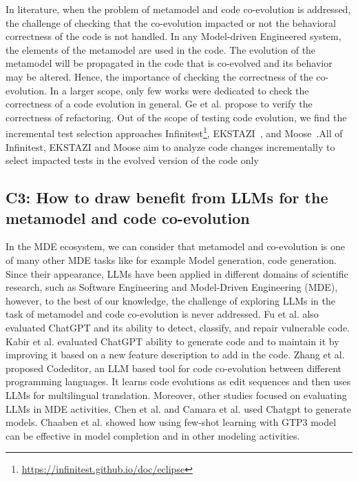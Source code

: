 In literature, when the problem of metamodel and code co-evolution is addressed, the challenge of checking that the co-evolution impacted or not the behavioral correctness of the code is not handled. In any Model-driven Engineered system, the elements of the metamodel are used in the code. The evolution of the metamodel will be propagated in the code that is co-evolved and its behavior may be altered. Hence, the importance of checking the correctness of the co-evolution. In a larger scope, only few works were dedicated to check the correctness of a code evolution in general. %
 Ge et al. \cite{ge2014Manual} propose to verify the correctness of refactoring.
Out of the scope of testing code evolution, we find the incremental test selection approaches Infinitest\footnote{\url{https://infinitest.github.io/doc/eclipse}}, EKSTAZI~\cite{7203050}, and Moose~\cite{ducasse2000moose}.All of Infinitest, EKSTAZI and Moose aim to analyze code changes incrementally to select impacted tests in the evolved version of the code only

\subsection*{C3: How to draw benefit from LLMs for the metamodel and code co-evolution}
In the MDE ecosystem, we can consider that metamodel and co-evolution is one of many other MDE tasks like for example Model generation, code generation. Since their appearance, LLMs have been applied in different domains of scientific research, such as Software Engineering and Model-Driven Engineering (MDE), however, to the best of our knowledge, the challenge of exploring LLMs in the task of metamodel and code co-evolution is never addressed. Fu et al. \cite{fu2023chatgpt} also evaluated ChatGPT and its ability to detect, classify, and repair vulnerable code. Kabir et al. \cite{kabir2023empirical} evaluated ChatGPT ability to generate code and to maintain it by improving it based on a new feature description to add in the code. Zhang et al. \cite{zhang2023multilingual} proposed Codeditor, an LLM based tool for code co-evolution between different programming languages. It learns code evolutions as edit sequences and then uses LLMs for multilingual translation.
Moreover, other studies focused on evaluating LLMs in MDE activities. 
Chen et al. \cite{10344012} and Camara et al. \cite{camara2023assessment} used Chatgpt to generate models.
Chaaben et al. \cite{chaaben2023towards} showed how using few-shot learning with GTP3 model can be effective in model completion and in other modeling activities. 
%
